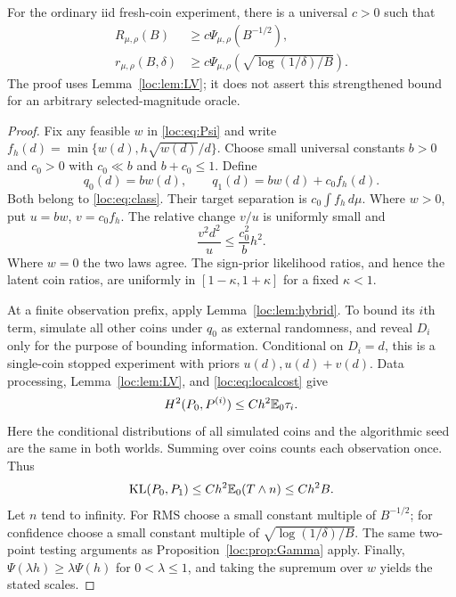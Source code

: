 \begin{theorem}\label{loc:thm:PsiLower}
For the ordinary iid fresh-coin experiment, there is a universal $c>0$ such that
\begin{align}
 R_{\mu,\rho}(B)&\ge c\Psi_{\mu,\rho}(B^{-1/2}),\label{loc:eq:psilowr}\\
 r_{\mu,\rho}(B,\delta)&\ge c\Psi_{\mu,\rho}\left(\sqrt{\log(1/\delta)/B}\right).\label{loc:eq:psilowh}
\end{align}
The proof uses Lemma~\ref{loc:lem:LV}; it does not assert this strengthened bound for an arbitrary selected-magnitude oracle.
\end{theorem}
\begin{proof}
Fix any feasible $w$ in \eqref{loc:eq:Psi} and write $f_h(d)=\min\{w(d),h\sqrt{w(d)}/d\}$. Choose small universal constants $b>0$ and $c_0>0$ with $c_0\ll b$ and $b+c_0\le1$. Define
\[
 q_0(d)=bw(d),\qquad q_1(d)=bw(d)+c_0f_h(d).
\]
Both belong to \eqref{loc:eq:class}. Their target separation is $c_0\int f_h\,d\mu$.
Where $w>0$, put $u=bw$, $v=c_0f_h$. The relative change $v/u$ is uniformly small and
\begin{equation}\label{loc:eq:localcost}
 \frac{v^2d^2}{u}\le \frac{c_0^2}{b}h^2.
\end{equation}
Where $w=0$ the two laws agree. The sign-prior likelihood ratios, and hence the latent coin ratios, are uniformly in $[1-\kappa,1+\kappa]$ for a fixed $\kappa<1$.

At a finite observation prefix, apply Lemma~\ref{loc:lem:hybrid}. To bound its $i$th term, simulate all other coins under $q_0$ as external randomness, and reveal $D_i$ only for the purpose of bounding information. Conditional on $D_i=d$, this is a single-coin stopped experiment with priors $u(d),u(d)+v(d)$. Data processing, Lemma~\ref{loc:lem:LV}, and \eqref{loc:eq:localcost} give
\[
 H^2(P_0,P^{(i)})\le C h^2\mathbb E_0\tau_i.
\]
Here the conditional distributions of all simulated coins and the algorithmic seed are the same in both worlds. Summing over coins counts each observation once. Thus
\[
 \operatorname{KL}(P_0,P_1)\le C h^2\mathbb E_0(T\wedge n)\le Ch^2B.
\]
Let $n$ tend to infinity. For RMS choose a small constant multiple of $B^{-1/2}$; for confidence choose a small constant multiple of $\sqrt{\log(1/\delta)/B}$. The same two-point testing arguments as Proposition~\ref{loc:prop:Gamma} apply. Finally, $\Psi(\lambda h)\ge\lambda\Psi(h)$ for $0<\lambda\le1$, and taking the supremum over $w$ yields the stated scales.
\end{proof}

